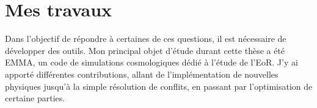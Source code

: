 %
%


\section*{Mes travaux}

Dans l'objectif de répondre à certaines de ces questions, il est nécessaire de développer des outils.
Mon principal objet d'étude durant cette thèse a été EMMA, un code de simulations cosmologiques dédié à l'étude de l'\ac{EoR}.
J'y ai apporté différentes contributions, allant de l'implémentation de nouvelles physiques jusqu'à la simple résolution de conflits, en passant par l'optimisation de certaine parties.

